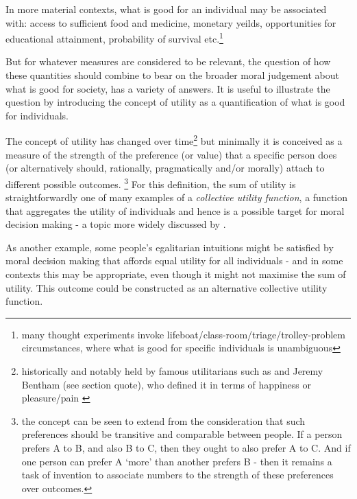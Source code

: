 In more material contexts, what is good for an individual may be associated with: access to sufficient food and medicine, monetary yeilds, opportunities for educational attainment, probability of survival etc.\footnote{many thought experiments invoke lifeboat/class-room/triage/trolley-problem circumstances, where what is good for specific individuals is unambiguous}

But for whatever measures are considered to be relevant, the question of how these quantities should combine to bear on the broader moral judgement about what is good for society, has a variety of answers.
It is useful to illustrate the question by introducing the concept of utility as a quantification of what is good for individuals.

The concept of utility has changed over time\footnote{historically and notably held by famous utilitarians such as \cite{MillGutenberg} and Jeremy Bentham (see section quote), who defined it in terms of happiness or pleasure/pain \citep{bentham1823introduction}}
but minimally it is conceived as a measure of the strength of the preference (or value) that a specific person does (or alternatively should, rationally, pragmatically and/or morally) attach to different possible outcomes.%
\footnote{the concept can be seen to extend from the consideration that such preferences should be transitive and comparable between people. If a person prefers A to B, and also B to C, then they ought to also prefer A to C. And if one person can prefer A `more' than another prefers B - then it remains a task of invention to associate numbers to the strength of these preferences over outcomes.}
For this definition, the sum of utility is straightforwardly one of many examples of a \textit{collective utility function}, a function that aggregates the utility of individuals and hence is a possible target for moral decision making - a topic more widely discussed by \cite{TheoriesofValueAggregation}.

As another example, some people's egalitarian intuitions might be satisfied by moral decision making that affords equal utility for all individuals - and in some contexts this may be appropriate, even though it might not maximise the sum of utility. This outcome could be constructed as an alternative collective utility function.

